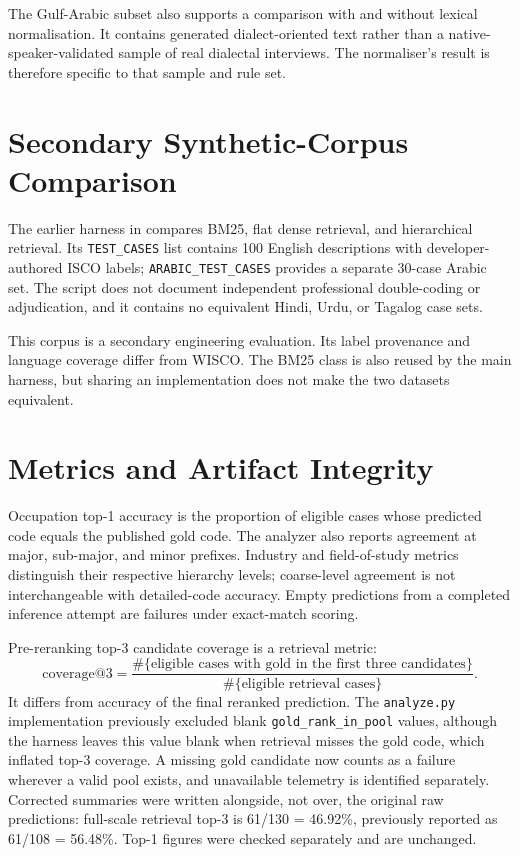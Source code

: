 The Gulf-Arabic subset also supports a comparison with and without lexical
normalisation. It contains generated dialect-oriented text rather than a
native-speaker-validated sample of real dialectal interviews. The
normaliser's result is therefore specific to that sample and rule set.

\section{Secondary Synthetic-Corpus Comparison}
\label{sec:eval-legacy}

The earlier harness in  compares
BM25, flat dense retrieval, and hierarchical retrieval. Its
\texttt{TEST\_CASES} list contains 100 English descriptions with
developer-authored ISCO labels; \texttt{ARABIC\_TEST\_CASES} provides a
separate 30-case Arabic set. The script does not document independent
professional double-coding or adjudication, and it contains no equivalent
Hindi, Urdu, or Tagalog case sets.

This corpus is a secondary engineering evaluation. Its label provenance
and language coverage differ from WISCO. The BM25 class is also reused by
the main harness, but sharing an implementation does not make the two
datasets equivalent.

\section{Metrics and Artifact Integrity}
\label{sec:eval-metrics}

Occupation top-1 accuracy is the proportion of eligible cases whose
predicted code equals the published gold code. The analyzer also reports
agreement at major, sub-major, and minor prefixes. Industry and
field-of-study metrics distinguish their respective hierarchy levels;
coarse-level agreement is not interchangeable with detailed-code accuracy.
Empty predictions from a completed inference attempt are failures under
exact-match scoring.

Pre-reranking top-3 candidate coverage is a retrieval metric:
\[
  \mathrm{coverage@3}
  = \frac{\#\{\text{eligible cases with gold in the first three candidates}\}}
          {\#\{\text{eligible retrieval cases}\}}.
\]
It differs from accuracy of the final reranked prediction. The
\texttt{analyze.py} implementation previously excluded blank
\texttt{gold\_rank\_in\_pool} values, although the harness leaves this value
blank when retrieval misses the gold code, which inflated top-3 coverage.
A missing gold candidate now counts as a failure wherever a valid pool
exists, and unavailable telemetry is identified separately. Corrected
summaries were written alongside, not over, the original raw predictions:
full-scale retrieval top-3 is 61/130 = 46.92\%, previously reported as
61/108 = 56.48\%. Top-1 figures were checked separately and are unchanged.

